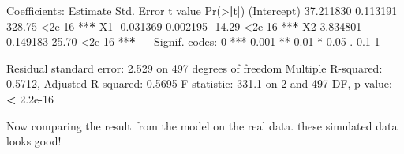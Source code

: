 \documentclass[
]{article}
\newenvironment{Shaded}{\begin{snugshade}}{\end{snugshade}}
\newcommand{\DecValTok}[1]{\textcolor[rgb]{0.00,0.00,0.81}{#1}}
\newcommand{\ErrorTok}[1]{\textcolor[rgb]{0.64,0.00,0.00}{\textbf{#1}}}
\newcommand{\FloatTok}[1]{\textcolor[rgb]{0.00,0.00,0.81}{#1}}
\newcommand{\FunctionTok}[1]{\textcolor[rgb]{0.00,0.00,0.00}{#1}}
\newcommand{\NormalTok}[1]{#1}
\newcommand{\SpecialCharTok}[1]{\textcolor[rgb]{0.00,0.00,0.00}{#1}}
\newcommand{\StringTok}[1]{\textcolor[rgb]{0.31,0.60,0.02}{#1}}
\begin{document}
\begin{Shaded}
\begin{Highlighting}[]
\NormalTok{Coefficients}\SpecialCharTok{:}
\NormalTok{             Estimate Std. Error t value }\FunctionTok{Pr}\NormalTok{(}\SpecialCharTok{\textgreater{}}\ErrorTok{|}\NormalTok{t}\SpecialCharTok{|}\NormalTok{)    }
\NormalTok{(Intercept) }\FloatTok{37.211830}   \FloatTok{0.113191}  \FloatTok{328.75}   \SpecialCharTok{\textless{}}\FloatTok{2e{-}16} \SpecialCharTok{**}\ErrorTok{*}
\NormalTok{X1          }\SpecialCharTok{{-}}\FloatTok{0.031369}   \FloatTok{0.002195}  \SpecialCharTok{{-}}\FloatTok{14.29}   \SpecialCharTok{\textless{}}\FloatTok{2e{-}16} \SpecialCharTok{**}\ErrorTok{*}
\NormalTok{X2           }\FloatTok{3.834801}   \FloatTok{0.149183}   \FloatTok{25.70}   \SpecialCharTok{\textless{}}\FloatTok{2e{-}16} \SpecialCharTok{**}\ErrorTok{*}
\SpecialCharTok{{-}{-}{-}}
\NormalTok{Signif. codes}\SpecialCharTok{:}  \DecValTok{0} \StringTok{\textquotesingle{}***\textquotesingle{}} \FloatTok{0.001} \StringTok{\textquotesingle{}**\textquotesingle{}} \FloatTok{0.01} \StringTok{\textquotesingle{}*\textquotesingle{}} \FloatTok{0.05} \StringTok{\textquotesingle{}.\textquotesingle{}} \FloatTok{0.1} \StringTok{\textquotesingle{} \textquotesingle{}} \DecValTok{1}

\NormalTok{Residual standard error}\SpecialCharTok{:} \FloatTok{2.529}\NormalTok{ on }\DecValTok{497}\NormalTok{ degrees of freedom}
\NormalTok{Multiple R}\SpecialCharTok{{-}}\NormalTok{squared}\SpecialCharTok{:}  \FloatTok{0.5712}\NormalTok{,    Adjusted R}\SpecialCharTok{{-}}\NormalTok{squared}\SpecialCharTok{:}  \FloatTok{0.5695} 
\NormalTok{F}\SpecialCharTok{{-}}\NormalTok{statistic}\SpecialCharTok{:} \FloatTok{331.1}\NormalTok{ on }\DecValTok{2}\NormalTok{ and }\DecValTok{497}\NormalTok{ DF,  p}\SpecialCharTok{{-}}\NormalTok{value}\SpecialCharTok{:} \ErrorTok{\textless{}} \FloatTok{2.2e{-}16}
\end{Highlighting}
\end{Shaded}

Now comparing the result from the model on the real data. these
simulated data looks good!
\end{document}
